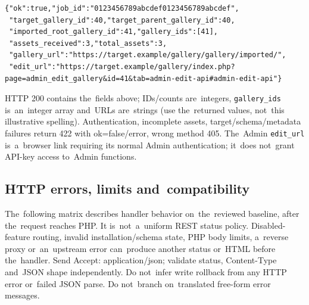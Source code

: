 \documentclass[11pt,a4paper]{article}
\newcommand{\codeword}[1]{\nolinkurl{#1}}
\begin{document}
\begin{lstlisting}[language={}]
{"ok":true,"job_id":"0123456789abcdef0123456789abcdef",
 "target_gallery_id":40,"target_parent_gallery_id":40,
 "imported_root_gallery_id":41,"gallery_ids":[41],
 "assets_received":3,"total_assets":3,
 "gallery_url":"https://target.example/gallery/gallery/imported/",
 "edit_url":"https://target.example/gallery/index.php?page=admin_edit_gallery&id=41&tab=admin-edit-api#admin-edit-api"}
\end{lstlisting}

HTTP 200 contains the~fields above; IDs/counts are~integers, \codeword{gallery_ids}
is~an~integer array and~URLs are~strings (use the~returned values, not~this illustrative
spelling). Authentication, incomplete assets, target/schema/metadata failures return 422
with ok=false/error, wrong method 405. The~Admin \codeword{edit_url} is~a~browser link
requiring its normal Admin authentication; it~does not~grant API-key access to~Admin
functions.

\subsection{\texorpdfstring{HTTP errors, limits and~compatibility}{HTTP errors, limits and compatibility}}

\label{api352:errors}

The~following matrix describes handler behavior on~the~reviewed baseline, after the~request
reaches PHP. It is~not~a~uniform REST status policy. Disabled-feature routing, invalid
installation/schema state, PHP body limits, a~reverse proxy or~an~upstream error can~produce
another status or~HTML before the~handler. Send Accept: application/json; validate status,
Content-Type and~JSON shape independently. Do not~infer write rollback from any HTTP error
or~failed JSON parse. Do not~branch on~translated free-form error messages.
\end{document}
